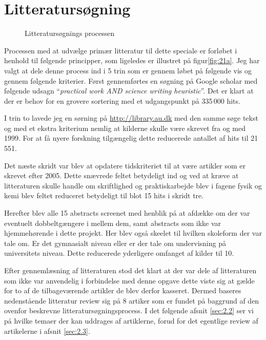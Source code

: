 \section{Litteratursøgning}
\label{sec:2.1}

\begin{wrapfigure}{o}{0.5\textwidth}
	\centering
	\vspace{-40pt}
	\caption{Litteratursøgnings processen}
	\label{fig:21a}
	\vspace{-20pt}
\end{wrapfigure}

Processen med at udvælge primær litteratur til dette speciale er forløbet i henhold til følgende principper, som ligeledes er illustret på  figur\vref{fig:21a}. Jeg har valgt at dele denne process ind i 5 trin som er gennem løbet på følgende vis og gennem følgende kriterier. Først gennemførtes en søgning på Google scholar med følgende udsagn ``\emph{practical work AND science writing heuristic}''. Det er klart at der er behov for en grovere sortering med et udgangspunkt på 335\,000 hits. 

I trin to lavede jeg en sørning på \url{http://library.au.dk} med den samme søge tekst og med et ekstra kriterium nemlig at kilderne skulle være skrevet fra og med 1999. For at få nyere forskning tilgængelig dette reducerede antallet af hits til 21\,551. 

Det næste skridt var blev at opdatere tidskriteriet til at være artikler som er skrevet efter 2005. Dette snævrede feltet betydeligt ind og ved at kræve at litteraturen skulle handle om skriftlighed og praktiskarbejde blev i fagene fysik og kemi blev feltet reduceret betydeligt til blot 15 hits i skridt tre.

Herefter blev alle 15 abstracts screenet med henblik på at afdække om der var eventuelt dobbeltgængere i mellem dem, samt abstracts som ikke var hjemmehørende i dette projekt. Her blev også skeelet til hvilken skoleform der var tale om. Er det gymnasialt niveau eller er der tale om undervisning på universitets niveau. Dette reducerede yderligere omfanget af kilder til 10.

Efter gennemlæsning af litteraturen stod det klart at der var dele af litteraturen som ikke var anvendelig i forbindelse med denne opgave dette viste sig at gælde for to af de tilbageværende artikler de blev derfor kasseret. Dermed baseres nedenstående litteratur review sig på 8 artiker som er fundet på baggrund af den ovenfor beskrevne litteratursøgningsprocess. I det følgende afsnit \vref{sec:2.2} ser vi på hvilke temaer der kan uddrages af artiklerne, forud for det egentlige review af artikelerne i afsnit \vref{sec:2.3}. 


